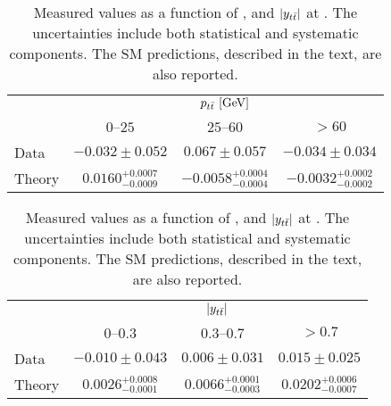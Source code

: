 \begin{table}[!htp]\centering
{}
\begin{tabular}{l c c c }
  &\multicolumn{3}{c}{$p_{t\bar{t}}{}~[\rm{GeV}]$}    \\
  \ac{} &     $0$--$25$           &        $25$--$60$         &  $>60$            \\
  \midrule
  Data  &    $-0.032\pm0.052$       &     $0.067\pm0.057$       &      $-0.034\pm0.034$     \\
  Theory & $0.0160^{+0.0007}_{-0.0009}$ & $-0.0058^{+0.0004}_{-0.0004}$ & $-0.0032^{+0.0002}_{-0.0002}$  \\
  \bottomrule
\end{tabular}
\begin{tabular}{l c c c }
  &\multicolumn{3}{c}{$|y_{t\bar{t}}{}|$}    \\
  \ac{}  &     $0$--$0.3$          &        $0.3$--$0.7$     &  $>0.7$            \\
  \midrule
  Data  &    $-0.010\pm0.043$       &     $0.006\pm0.031$     &      $0.015\pm0.025$     \\
  Theory & $0.0026^{+0.0008}_{-0.0001}$ & $0.0066^{+0.0001}_{-0.0003}$ & $0.0202^{+0.0006}_{-0.0007}$ \\
  \bottomrule
\end{tabular}
\label{tab:results7tev}
\caption{Measured \ac{} values as a function of \mtt{}, \pttt{} and
  $|y_{t\bar{t}}{}|$ at \seventev{}. The uncertainties include both statistical and
  systematic components. The SM predictions, described in the text,
  are also reported.} 
\end{table}
